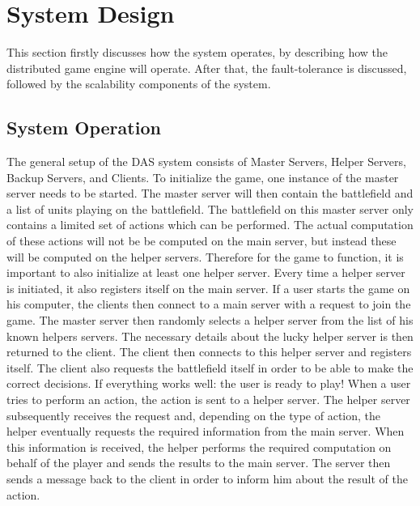 \section{System Design}
This section firstly discusses how the system operates, by describing how the distributed game engine will operate.
After that, the fault-tolerance is discussed, followed by the scalability components of the system.

\subsection{System Operation}
The general setup of the DAS system consists of Master Servers, Helper Servers, Backup Servers, and Clients.
To initialize the game, one instance of the master server needs to be started. 
The master server will then contain the battlefield and a list of units playing on the battlefield.
The battlefield on this master server only contains a limited set of actions which can be performed.
The actual computation of these actions will not be be computed on the main server, but instead these will be computed on the helper servers.
Therefore for the game to function, it is important to also initialize at least one helper server. 
Every time a helper server is initiated, it also registers itself on the main server.
If a user starts the game on his computer, the clients then connect to a main server with a request to join the game.
The master server then randomly selects a helper server from the list of his known helpers servers.
The necessary details about the lucky helper server is then returned to the client. 
The client then connects to this helper server and registers itself.
The client also requests  the battlefield itself in order to be able to make the correct decisions. 
If everything works well: the user is ready to play!
When a user tries to perform an action, the action is sent to a helper server.
The helper server subsequently receives the request and, depending on the type of action, the helper  eventually requests the required information from the main server.
When this information is received, the helper performs the required computation on behalf of the player and sends the results to the main server.
The server then sends a message back to the client in order to inform him about the result of the action.

